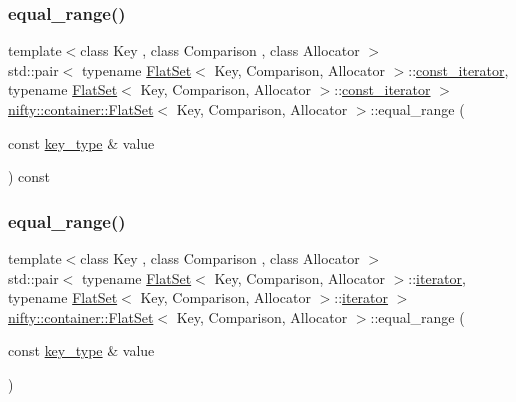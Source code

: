 \subsubsection{\texorpdfstring{equal\+\_\+range()}{equal\_range()}\hspace{0.1cm}{\footnotesize\ttfamily [1/2]}}
{\footnotesize\ttfamily template$<$class Key , class Comparison , class Allocator $>$ \\
std\+::pair$<$ typename \hyperlink{classnifty_1_1container_1_1FlatSet}{Flat\+Set}$<$ Key, Comparison, Allocator $>$\+::\hyperlink{classnifty_1_1container_1_1FlatSet_a0f4cd26da060859b18742abfd534aa24}{const\+\_\+iterator}, typename \hyperlink{classnifty_1_1container_1_1FlatSet}{Flat\+Set}$<$ Key, Comparison, Allocator $>$\+::\hyperlink{classnifty_1_1container_1_1FlatSet_a0f4cd26da060859b18742abfd534aa24}{const\+\_\+iterator} $>$ \hyperlink{classnifty_1_1container_1_1FlatSet}{nifty\+::container\+::\+Flat\+Set}$<$ Key, Comparison, Allocator $>$\+::equal\+\_\+range (\begin{DoxyParamCaption}\item[{const \hyperlink{classnifty_1_1container_1_1FlatSet_a0101a4574052389646be8d9bf092a949}{key\+\_\+type} \&}]{value }\end{DoxyParamCaption}) const\hspace{0.3cm}{\ttfamily [inline]}}

\mbox{\label{classnifty_1_1container_1_1FlatSet_a777b777d0e79a499a72661e62fabc903}} 
\subsubsection{\texorpdfstring{equal\+\_\+range()}{equal\_range()}\hspace{0.1cm}{\footnotesize\ttfamily [2/2]}}
{\footnotesize\ttfamily template$<$class Key , class Comparison , class Allocator $>$ \\
std\+::pair$<$ typename \hyperlink{classnifty_1_1container_1_1FlatSet}{Flat\+Set}$<$ Key, Comparison, Allocator $>$\+::\hyperlink{classnifty_1_1container_1_1FlatSet_a9c7fd20cd6b1878ccb8a7e068072c795}{iterator}, typename \hyperlink{classnifty_1_1container_1_1FlatSet}{Flat\+Set}$<$ Key, Comparison, Allocator $>$\+::\hyperlink{classnifty_1_1container_1_1FlatSet_a9c7fd20cd6b1878ccb8a7e068072c795}{iterator} $>$ \hyperlink{classnifty_1_1container_1_1FlatSet}{nifty\+::container\+::\+Flat\+Set}$<$ Key, Comparison, Allocator $>$\+::equal\+\_\+range (\begin{DoxyParamCaption}\item[{const \hyperlink{classnifty_1_1container_1_1FlatSet_a0101a4574052389646be8d9bf092a949}{key\+\_\+type} \&}]{value }\end{DoxyParamCaption})\hspace{0.3cm}{\ttfamily [inline]}}

